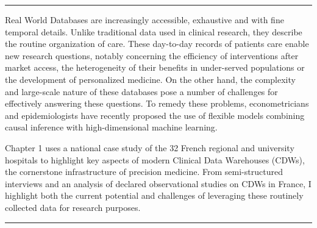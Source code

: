 \documentclass[french,12pt,twoside,a4paper]{book}
\newenvironment{abstract}
{%
  \hfill%
  \begin{minipage}{.8\linewidth}\rmfamily\small
    \hrule\vspace*{.5ex}
    }
    {%
    \hrule%
  \end{minipage}%
  \vfill
}
\begin{document}
\begin{abstract}

  Real World Databases are increasingly accessible, exhaustive and with
  fine temporal details. Unlike traditional data used in clinical research, they
  describe the routine organization of care. These day-to-day records of
  patients care enable new research questions, notably concerning the efficiency
  of interventions after market access, the heterogeneity of their benefits in
  under-served populations or the development of personalized medicine. On the
  other hand, the complexity and large-scale nature of these databases pose a
  number of challenges for effectively answering these questions. To remedy
  these problems, econometricians and epidemiologists have recently proposed
  the use of flexible models combining causal inference with high-dimensional
  machine learning.

  Chapter 1 uses a national case study of the 32 French regional and
  university hospitals to highlight key aspects of modern Clinical Data
  Warehouses (CDWs), the cornerstone infrastructure of precision medicine. From
  semi-structured interviews and an analysis of declared observational studies
  on CDWs in France, I highlight both the current potential and challenges of
  leveraging these routinely collected data for research purposes.




\end{abstract}
\end{document}
